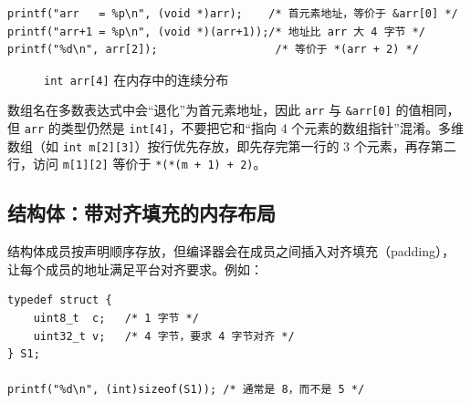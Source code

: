 \begin{lstlisting}[style=c]
printf("arr   = %p\n", (void *)arr);    /* 首元素地址，等价于 &arr[0] */
printf("arr+1 = %p\n", (void *)(arr+1));/* 地址比 arr 大 4 字节 */
printf("%d\n", arr[2]);                  /* 等价于 *(arr + 2) */
\end{lstlisting}

\begin{figure}[htbp]
\centering
\caption{\texttt{int arr[4]} 在内存中的连续分布} \label{fig:array-memory}
\end{figure}

数组名在多数表达式中会“退化”为首元素地址，因此 \texttt{arr} 与 \texttt{\&arr[0]} 的值相同，但 \texttt{arr} 的类型仍然是 \texttt{int[4]}，不要把它和“指向 4 个元素的数组指针”混淆。多维数组（如 \texttt{int m[2][3]}）按行优先存放，即先存完第一行的 3 个元素，再存第二行，访问 \texttt{m[1][2]} 等价于 \texttt{*(*(m + 1) + 2)}。

\subsection{结构体：带对齐填充的内存布局}

结构体成员按声明顺序存放，但编译器会在成员之间插入对齐填充（padding），让每个成员的地址满足平台对齐要求。例如：

\begin{lstlisting}[style=c]
typedef struct {
    uint8_t  c;   /* 1 字节 */
    uint32_t v;   /* 4 字节，要求 4 字节对齐 */
} S1;

printf("%d\n", (int)sizeof(S1)); /* 通常是 8，而不是 5 */
\end{lstlisting}

